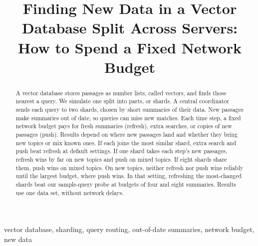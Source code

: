 \documentclass[conference]{IEEEtran}
\newif\ifanonymous
\begin{document}
\setlength{\textfloatsep}{6pt plus 2pt minus 2pt}
\setlength{\floatsep}{6pt plus 2pt minus 2pt}
\setlength{\dbltextfloatsep}{6pt plus 2pt minus 2pt}

\title{Finding New Data in a Vector Database Split Across Servers: How to Spend a Fixed Network Budget}

\ifanonymous
\author{\IEEEauthorblockN{Anonymous Authors}}
\else
\author{
}
\fi

\maketitle

\begin{abstract}
A vector database stores passages as number lists, called vectors, and finds those nearest a query.
We simulate one split into \RNumNumShards{} parts, or shards.
A central coordinator sends each query to two shards, chosen by short summaries of their data.
New passages make summaries out of date, so queries can miss new matches.
Each time step, a fixed network budget pays for fresh summaries (refresh), extra searches, or copies of new passages (push).
Results depend on where new passages land and whether they bring new topics or mix known ones.
If each joins the most similar shard, extra search and push beat refresh at default settings.
If one shard takes each step's new passages, refresh wins by far on new topics and push on mixed topics.
If eight shards share them, push wins on mixed topics.
On new topics, neither refresh nor push wins reliably until the largest budget, where push wins.
In that setting, refreshing the most-changed shards beat our sample-query probe at budgets of four and eight summaries.
Results use one data set, without network delays.
\end{abstract}

\begin{IEEEkeywords}
vector database, sharding, query routing, out-of-date summaries, network budget, new data
\end{IEEEkeywords}








\end{document}
